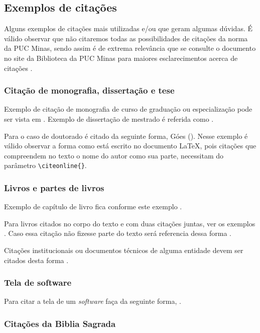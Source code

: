 \subsection{\esp Exemplos de citações}

Alguns exemplos de citações mais utilizadas e/ou que geram algumas dúvidas. É válido observar que não citaremos
todas as possibilidades de citações da norma da PUC Minas, sendo assim é de extrema relevância que se consulte
o documento no site da Biblioteca da PUC Minas para maiores esclarecimentos acerca de citações \cite{manualpuc}.

\subsubsection{\esp Citação de monografia, dissertação e tese}

Exemplo de citação de monografia de curso de graduação ou especialização pode ser vista em .
Exemplo de dissertação de mestrado é referida como .

Para o caso de doutorado é citado da seguinte forma, Góes (\citeyear{tese}). Nesse exemplo é válido observar a forma
como está escrito no documento \LaTeX, pois citações que compreendem no texto o nome do autor como sua parte, necessitam
do parâmetro \verb$\citeonline{}$.

\subsubsection{\esp Livros e partes de livros}

Exemplo de capítulo de livro fica conforme este exemplo \cite{cap-livro}.

Para livros citados no corpo do texto e com duas citações juntas, ver os exemplos .
Caso essa citação não fizesse parte do texto será referencia dessa forma \cite{knuth,groupp}.

Citações institucionais ou documentos técnicos de alguma entidade devem ser citados desta forma \cite{pmbok}.

\subsubsection{\esp Tela de software}

Para  citar a tela de um \textit{software} faça da seguinte forma, .

\subsubsection{\esp Citações da Biblia Sagrada}

